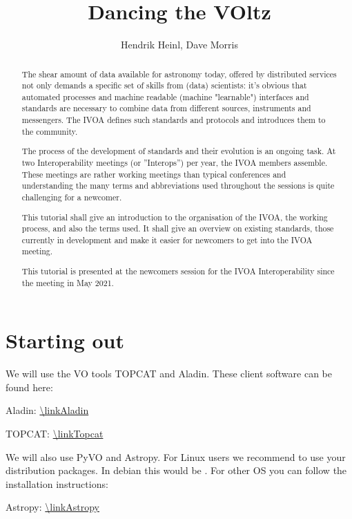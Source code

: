 \documentclass[twoside]{article}[12pt]
\title {Dancing the VOltz}
\author {Hendrik Heinl, Dave Morris}
\begin{document}

\maketitle

\pagebreak
\begin {abstract}
The shear amount of data available for astronomy today, offered by
distributed services not only demands a specific set of skills from
(data) scientists: it's obvious that automated processes and machine
readable (machine "learnable") interfaces and standards are necessary to
combine data from different sources, instruments and messengers. The
IVOA defines such standards and protocols and introduces them to the
community. 

The process of the development of standards and their evolution is an
ongoing task. At two Interoperability meetings (or ''Interops'') per
year, the IVOA members assemble. These meetings are rather working
meetings than typical conferences and understanding the many terms and
abbreviations used throughout the sessions is quite challenging for a
newcomer.  

This tutorial shall give an introduction to the organisation of the
IVOA, the working process, and also the terms used. It shall give an
overview on existing standards, those currently in development and make
it easier for newcomers to get into the IVOA meeting.

This tutorial is presented at the newcomers session for the IVOA
Interoperability since the meeting in May 2021.
\end{abstract}


\section{Starting out}
We will use the VO tools TOPCAT and Aladin. These client
software can be found here:

Aladin: \url{\linkAladin}

TOPCAT: \url{\linkTopcat}

We will also use PyVO and Astropy. For Linux users we recommend to use
your distribution packages. In debian this would be 
. For other OS you can
follow the installation instructions:

Astropy: \url{\linkAstropy}
\end{document}
